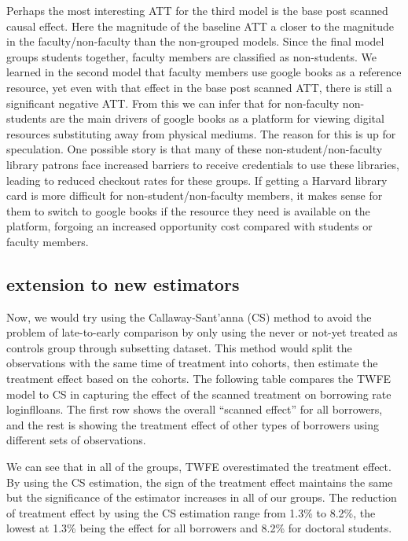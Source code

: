 \documentclass{article}
\begin{document}
Perhaps the most interesting ATT for the third model is the base post scanned causal effect. Here the magnitude of the baseline ATT a closer to the magnitude in the faculty/non-faculty than the non-grouped models. Since the final model groups students together, faculty members are classified as non-students. We learned in the second model that faculty members use google books as a reference resource, yet even with that effect in the base post scanned ATT, there is still a significant negative ATT. From this we can infer that for non-faculty non-students are the main drivers of google books as a platform for viewing digital resources substituting away from physical mediums. The reason for this is up for speculation. One possible story is that many of these non-student/non-faculty library patrons face increased barriers to receive credentials to use these libraries, leading to reduced checkout rates for these groups. If getting a Harvard library card is more difficult for non-student/non-faculty members, it makes sense for them to switch to google books if the resource they need is available on the platform, forgoing an increased opportunity cost compared with students or faculty members.


\subsection{extension to new estimators}
Now, we would try using the Callaway-Sant’anna (CS) method to avoid the problem of late-to-early comparison by only using the never or not-yet treated as controls group through subsetting dataset. This method would split the observations with the same time of treatment into cohorts, 
then estimate the treatment effect based on the cohorts.
The following table compares the TWFE model to CS in capturing the effect of the scanned treatment on borrowing rate loginflloans. The first row shows the overall “scanned effect” for all borrowers, and the rest is showing the treatment effect of other types of borrowers using different sets of observations.


 
We can see that in all of the groups, TWFE overestimated the treatment effect. By using the CS estimation, the sign of the treatment effect maintains the same but the significance of the estimator increases in all of our groups. The reduction of treatment effect by using the CS estimation range from 1.3\% to 8.2\%, the lowest at 1.3\% being the effect for all borrowers and 8.2\% for doctoral students.
\end{document}
